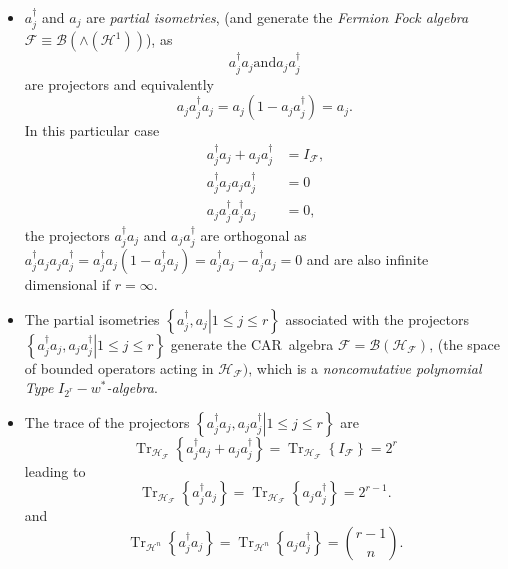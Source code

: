 \documentclass[aps, preprint]{revtex4}
\begin{document}
\begin{itemize}
\item $a_{j}^{ \dag }$ and $a_{j}$ are \emph{partial isometries}, (and generate the \emph{Fermion Fock algebra} $\mathcal{F} \equiv \mathcal{B} \left ( \wedge \left (\mathcal{H}^{1}\right )\right )$), as
\begin{equation}a_{j}^{ \dag } a_{j}\text{and}a_{j} a_{j}^{ \dag }
\end{equation}are projectors and equivalently
\begin{equation}a_{j} a_{j}^{\dag } a_{j} =a_{j} \left (1 -a_{j} a_{j}^{\dag }\right ) =a_{j}\text{.}
\end{equation}In this particular case
\begin{align}a_{j}^{\dag } a_{j} +a_{j} a_{j}^{\dag } &  =I_{\mathcal{F}}\text{,} \\
a_{j}^{\dag } a_{j} a_{j} a_{j}^{\dag } &  =0 \\
a_{j} a_{j}^{\dag } a_{j}^{\dag } a_{j} &  =0\text{,}\end{align}the projectors $a_{j}^{\dag } a_{j}$ and $a_{j} a_{j}^{\dag }$ are orthogonal as $a_{j}^{\dag } a_{j} a_{j} a_{j}^{\dag } =a_{j}^{\dag } a_{j} \left (1 -a_{j}^{\dag } a_{j}\right ) =a_{j}^{\dag } a_{j} -a_{j}^{\dag } a_{j} =0$ and are also infinite dimensional if $r =\infty $. 

\item The partial isometries $\left \{\left .a_{j}^{ \dag } ,a_{j}\right \vert 1 \leq j \leq r\text{}\right \}$ associated with the projectors $\left \{\left .a_{j}^{ \dag } a_{j} ,a_{j} a_{j}^{ \dag }\right \vert 1 \leq j \leq r\text{}\right \}$ generate the CAR\ algebra $\mathcal{F} =\mathcal{B} \left (\mathcal{H}_{\mathcal{F}}\right )\text{,}$ (the space of bounded operators acting in $\mathcal{H}_{\mathcal{F}})\text{,}$ which is a \emph{noncomutative polynomial Type }$I_{2^{r}} -w^{ \ast }$\emph{-algebra}. 

\item The trace of the projectors $\left \{\left .a_{j}^{ \dag } a_{j} ,a_{j} a_{j}^{ \dag }\right \vert 1 \leq j \leq r\text{}\right \}$ are
\begin{equation}\ensuremath{\operatorname*{Tr}}_{\mathcal{H}_{\mathcal{F}}} \left \{a_{j}^{\dag } a_{j} +a_{j} a_{j}^{\dag }\right \} =\ensuremath{\operatorname*{Tr}}_{\mathcal{H}_{\mathcal{F}}} \left \{I_{\mathcal{F}}\right \} =2^{r}
\end{equation}leading to
\begin{equation}\ensuremath{\operatorname*{Tr}}_{\mathcal{H}_{\mathcal{F}}} \left \{a_{j}^{\dag } a_{j}\right \} =\ensuremath{\operatorname*{Tr}}_{\mathcal{H}_{\mathcal{F}}} \left \{a_{j} a_{j}^{\dag }\right \} =2^{r -1}\text{.}
\end{equation}and
\begin{equation}\ensuremath{\operatorname*{Tr}}_{\mathcal{H}^{n}} \left \{a_{j}^{\dag } a_{j}\right \} =\ensuremath{\operatorname*{Tr}}_{\mathcal{H}^{n}} \left \{a_{j} a_{j}^{\dag }\right \} =\binom{r -1}{n}\text{.}
\end{equation}


\end{itemize}
\end{document}
